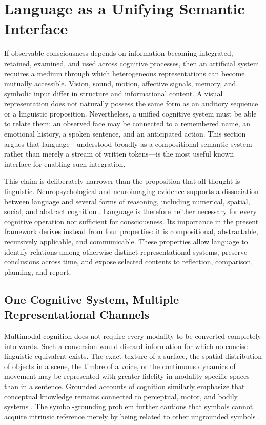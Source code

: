 \section{\textbf{Language as a Unifying Semantic Interface}}
\label{sec:language-interface}

If observable consciousness depends on information becoming integrated, retained, examined, and used across cognitive processes, then an artificial system requires a medium through which heterogeneous representations can become mutually accessible. Vision, sound, motion, affective signals, memory, and symbolic input differ in structure and informational content. A visual representation does not naturally possess the same form as an auditory sequence or a linguistic proposition. Nevertheless, a unified cognitive system must be able to relate them: an observed face may be connected to a remembered name, an emotional history, a spoken sentence, and an anticipated action. This section argues that language---understood broadly as a compositional semantic system rather than merely a stream of written tokens---is the most useful known interface for enabling such integration.

This claim is deliberately narrower than the proposition that all thought is linguistic. Neuropsychological and neuroimaging evidence supports a dissociation between language and several forms of reasoning, including numerical, spatial, social, and abstract cognition \cite{fedorenko2016language,fedorenko2024communication}. Language is therefore neither necessary for every cognitive operation nor sufficient for consciousness. Its importance in the present framework derives instead from four properties: it is compositional, abstractable, recursively applicable, and communicable. These properties allow language to identify relations among otherwise distinct representational systems, preserve conclusions across time, and expose selected contents to reflection, comparison, planning, and report.

\subsection{One Cognitive System, Multiple Representational Channels}
\label{subsec:multiple-representational-channels}

Multimodal cognition does not require every modality to be converted completely into words. Such a conversion would discard information for which no concise linguistic equivalent exists. The exact texture of a surface, the spatial distribution of objects in a scene, the timbre of a voice, or the continuous dynamics of movement may be represented with greater fidelity in modality-specific spaces than in a sentence. Grounded accounts of cognition similarly emphasize that conceptual knowledge remains connected to perceptual, motor, and bodily systems \cite{barsalou2008grounded}. The symbol-grounding problem further cautions that symbols cannot acquire intrinsic reference merely by being related to other ungrounded symbols \cite{harnad1990symbol}.

